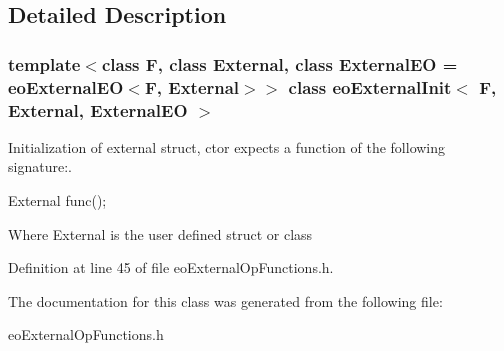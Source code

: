 \subsection{Detailed Description}
\subsubsection*{template$<$class F, class External, class External\-EO = eo\-External\-EO$<$F, External$>$$>$ class eo\-External\-Init$<$ F, External, External\-EO $>$}

Initialization of external struct, ctor expects a function of the following signature:. 

External func();

Where External is the user defined struct or class 



Definition at line 45 of file eo\-External\-Op\-Functions.h.

The documentation for this class was generated from the following file:\begin{CompactItemize}
\item 
eo\-External\-Op\-Functions.h\end{CompactItemize}
